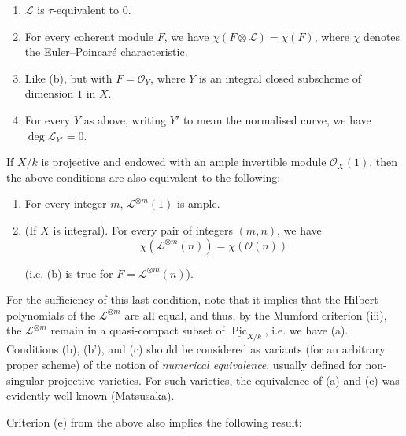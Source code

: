 \begin{remark}{}
\begin{enumerate}
          
 \begin{enumerate}
            
 \item[a.]
              \(\mathscr {L}\) is \(\tau \)-equivalent to \(0\).
            

            
 \item[b.]
              For every coherent module \(F\), we have \(\chi (F\otimes \mathscr {L})=\chi (F)\), where \(\chi \) denotes the Euler–Poincaré characteristic.
            

            
 \item[b'.]
              Like (b), but with \(F=\mathcal {O}_Y\), where \(Y\) is an integral closed subscheme of dimension \(1\) in \(X\).
            

            
 \item[c.]
              For every \(Y\) as above, writing \(Y'\) to mean the normalised curve, we have \(\deg \mathscr {L}_{Y'}=0\).
            

          \end{enumerate}


          If \(X/k\) is projective and endowed with an ample invertible module \(\mathcal {O}_X(1)\), then the above conditions are also equivalent to the following:

          
 \begin{enumerate}
            
 \item[d.]
              For every integer \(m\), \(\mathscr {L}^{\otimes  m}(1)\) is ample.
            

            
 \item[e.]
              (If \(X\) is integral).
              For every pair of integers \((m,n)\), we have
              \[                 \chi (\mathscr {L}^{\otimes  m}(n))                 = \chi (\mathcal {O}(n))               \]
              
              (i.e. (b) is true for \(F=\mathscr {L}^{\otimes  m}(n)\)).
            

          \end{enumerate}
      

    \end{enumerate}\par{}For the sufficiency of this last condition, note that it implies that the Hilbert polynomials of the \(\mathscr {L}^{\otimes  m}\) are all equal, and thus, by the Mumford criterion (iii), the \(\mathscr {L}^{\otimes  m}\) remain in a quasi-compact subset of \(\underline {\operatorname {Pic}}_{X/k}\), i.e. we have (a).
    Conditions (b), (b'), and (c) should be considered as variants (for an arbitrary proper scheme) of the notion of \emph{numerical equivalence}, usually defined for non-singular projective varieties.
    For such varieties, the equivalence of (a) and (c) was evidently well known (Matsusaka).\par{}Criterion (e) from the above also implies the following result:


\end{remark}
